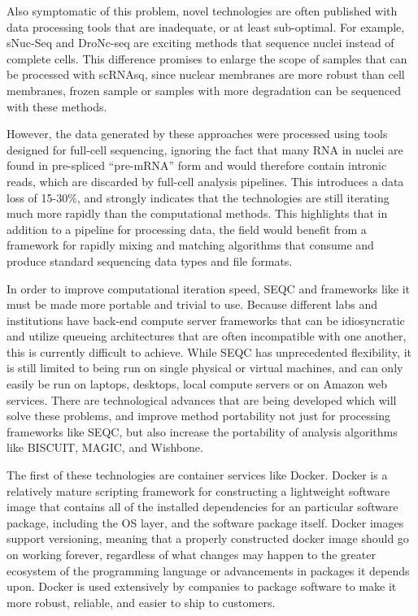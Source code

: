 Also symptomatic of this problem, novel technologies are often published with data processing tools that are inadequate, or at least sub-optimal. 
For example, sNuc-Seq \citep{Habib2016} and DroNc-seq \citep{Habib2017} are exciting methods that sequence nuclei instead of complete cells.
This difference promises to enlarge the scope of samples that can be processed with scRNAsq, since nuclear membranes are more robust than cell membranes, frozen sample or samples with more degradation can be sequenced with these methods. 

However, the data generated by these approaches were processed using tools designed for full-cell sequencing, ignoring the fact that many RNA in nuclei are found in pre-spliced ``pre-mRNA'' form and would therefore contain intronic reads, which are discarded by full-cell analysis pipelines. 
This introduces a data loss of 15-30\%, and strongly indicates that the technologies are still iterating much more rapidly than the computational methods. 
This highlights that in addition to a pipeline for processing data, the field would benefit from a framework for rapidly mixing and matching algorithms that consume and produce standard sequencing data types and file formats.  

In order to improve computational iteration speed, SEQC and frameworks like it must be made more portable and trivial to use. 
Because different labs and institutions have back-end compute server frameworks that can be idiosyncratic and utilize queueing architectures that are often incompatible with one another, this is currently difficult to achieve. 
While SEQC has unprecedented flexibility, it is still limited to being run on single physical or virtual machines, and can only easily be run on laptops, desktops, local compute servers or on Amazon web services. 
There are technological advances that are being developed which will solve these problems, and improve method portability not just for processing frameworks like SEQC, but also increase the portability of analysis algorithms like BISCUIT, MAGIC, and Wishbone.  

The first of these technologies are container services like Docker. 
Docker is a relatively mature scripting framework for constructing a lightweight software image that contains all of the installed dependencies for an particular software package, including the OS layer, and the software package itself. 
Docker images support versioning, meaning that a properly constructed docker image should go on working forever, regardless of what changes may happen to the greater ecosystem of the programming language or advancements in packages it depends upon. 
Docker is used extensively by companies to package software to make it more robust, reliable, and easier to ship to customers. 

